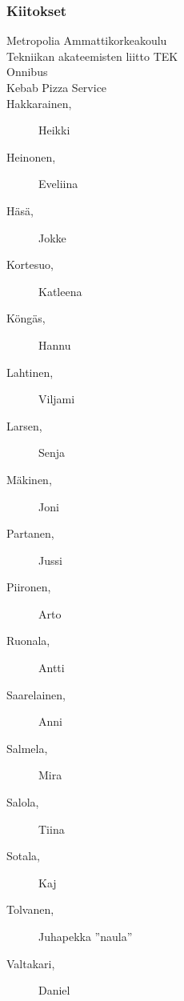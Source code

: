 \subsubsection*{Kiitokset}
\begin{multicols}{2}
\begin{description}
\item[Metropolia Ammattikorkeakoulu]
\item[Tekniikan akateemisten liitto TEK]
\item[Onnibus]
\item[Kebab Pizza Service]
\item[Hakkarainen, ] Heikki
\item[Heinonen, ] Eveliina
\item[Häsä, ] Jokke
\item[Kortesuo, ] Katleena
\item[Köngäs, ] Hannu
\item[Lahtinen, ] Viljami
\item[Larsen, ] Senja
\item[Mäkinen, ] Joni
\item[Partanen, ] Jussi
\item[Piironen, ] Arto
\item[Ruonala, ] Antti
\item[Saarelainen, ] Anni
\item[Salmela, ] Mira
\item[Salola, ] Tiina
\item[Sotala, ] Kaj
\item[Tolvanen, ] Juhapekka ''naula''
\item[Valtakari, ] Daniel
\end{description}
\end{multicols}